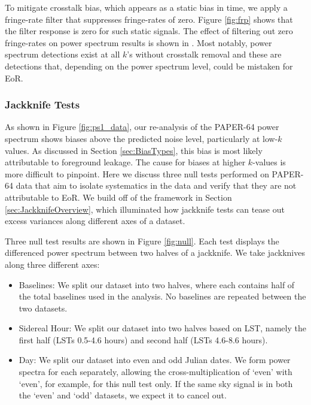 \documentclass[preprint2,numberedappendix,tighten]{aastex6}  %
\begin{document}
To mitigate crosstalk bias, which appears as a static bias in time, we apply a fringe-rate filter that suppresses fringe-rates of 
zero. Figure \ref{fig:frp} shows that the filter response is zero for such static signals. The effect of filtering out zero fringe-rates 
on power spectrum results is shown in . Most notably, power spectrum detections exist at all $k$'s without crosstalk 
removal and these are detections that, depending on the power spectrum level, could be mistaken for EoR. 

\subsubsection{Jackknife Tests}

As shown in Figure \ref{fig:ps1_data}, our re-analysis of the PAPER-64 power spectrum shows biases above the predicted noise level, particularly at low-$k$ values. As discussed in Section \ref{sec:BiasTypes}, this bias is
most likely attributable to foreground leakage. The cause for biases at higher $k$-values is more difficult to pinpoint. Here we discuss three null tests performed on PAPER-64 data that aim to isolate systematics in the data and verify 
that they are not attributable to EoR. We build off of the framework in Section \ref{sec:JackknifeOverview}, which illuminated how jackknife tests can tease out excess variances along different axes of a dataset.

Three null test results are shown in Figure \ref{fig:null}. Each test displays the differenced power spectrum between two halves of a jackknife. We take jackknives along three different axes:

\begin{itemize}
\item Baselines: We split our dataset into two halves, where each contains half of the total baselines used in the 
analysis. No baselines are repeated between the two datasets.
\item Sidereal Hour: We split our dataset into two halves based on LST, namely the first half (LSTs 0.5-4.6 hours) and second half (LSTs 
4.6-8.6 hours).
\item Day: We split our dataset into even and odd Julian dates. We form power spectra for each separately, allowing the cross-multiplication of `even' with `even', for example, for this null test only. If the same sky signal is in both the `even' and `odd' datasets, we expect it to cancel out. %
\end{itemize}
\end{document}
